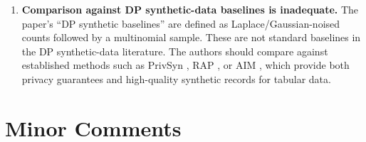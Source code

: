 \documentclass[12pt]{article}
\begin{document}
\begin{enumerate}[label=\textbf{M\arabic*.}, resume, leftmargin=*, wide=0pt]
\item \textbf{Comparison against DP synthetic-data baselines is inadequate.}
The paper's ``DP synthetic baselines'' are defined as Laplace/Gaussian-noised counts followed by a multinomial sample. These are not standard baselines in the DP synthetic-data literature. The authors should compare against established methods such as PrivSyn \cite{zhang2021privsyn}, RAP \cite{aydore2021differentially}, or AIM \cite{mckenna2022aim}, which provide both privacy guarantees and high-quality synthetic records for tabular data.

\end{enumerate}

\section{Minor Comments}
\end{document}
